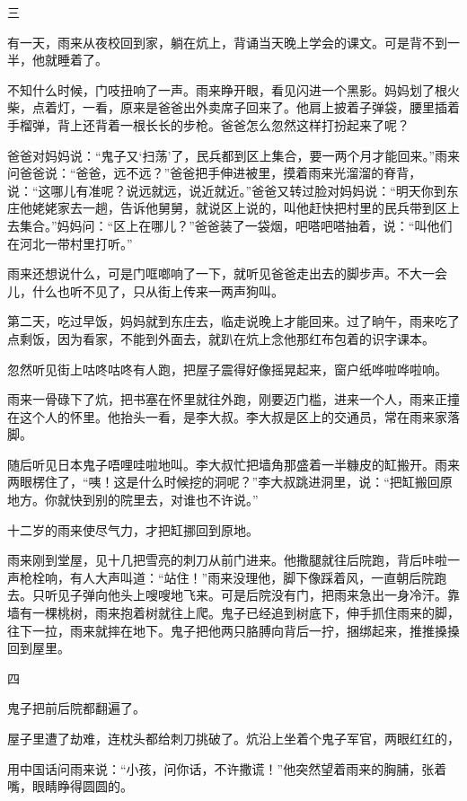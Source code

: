 \documentclass[12pt,UTF-8,openany]{ctexbook}
\begin{document}
\begin{Large}
    三
    
    有一天，雨来从夜校回到家，躺在炕上，背诵当天晚上学会的课文。可是背不到一半，他就睡着了。
    
    不知什么时候，门吱扭响了一声。雨来睁开眼，看见闪进一个黑影。妈妈划了根火柴，点着灯，一看，原来是爸爸出外卖席子回来了。他肩上披着子弹袋，腰里插着手榴弹，背上还背着一根长长的步枪。爸爸怎么忽然这样打扮起来了呢？
    
    爸爸对妈妈说：“鬼子又‘扫荡’了，民兵都到区上集合，要一两个月才能回来。”雨来问爸爸说：“爸爸，远不远？”爸爸把手伸进被里，摸着雨来光溜溜的脊背，说：“这哪儿有准呢？说远就远，说近就近。”爸爸又转过脸对妈妈说：“明天你到东庄他姥姥家去一趟，告诉他舅舅，就说区上说的，叫他赶快把村里的民兵带到区上去集合。”妈妈问：“区上在哪儿？”爸爸装了一袋烟，吧嗒吧嗒抽着，说：“叫他们在河北一带村里打听。”
    
    雨来还想说什么，可是门哐啷响了一下，就听见爸爸走出去的脚步声。不大一会儿，什么也听不见了，只从街上传来一两声狗叫。
    
    第二天，吃过早饭，妈妈就到东庄去，临走说晚上才能回来。过了晌午，雨来吃了点剩饭，因为看家，不能到外面去，就趴在炕上念他那红布包着的识字课本。
    
    忽然听见街上咕咚咕咚有人跑，把屋子震得好像摇晃起来，窗户纸哗啦哗啦响。
    
    雨来一骨碌下了炕，把书塞在怀里就往外跑，刚要迈门槛，进来一个人，雨来正撞在这个人的怀里。他抬头一看，是李大叔。李大叔是区上的交通员，常在雨来家落脚。
    
    随后听见日本鬼子唔哩哇啦地叫。李大叔忙把墙角那盛着一半糠皮的缸搬开。雨来两眼楞住了，“咦！这是什么时候挖的洞呢？”李大叔跳进洞里，说：“把缸搬回原地方。你就快到别的院里去，对谁也不许说。”
    
    十二岁的雨来使尽气力，才把缸挪回到原地。
    
    雨来刚到堂屋，见十几把雪亮的刺刀从前门进来。他撒腿就往后院跑，背后咔啦一声枪栓响，有人大声叫道：“站住！”雨来没理他，脚下像踩着风，一直朝后院跑去。只听见子弹向他头上嗖嗖地飞来。可是后院没有门，把雨来急出一身冷汗。靠墙有一棵桃树，雨来抱着树就往上爬。鬼子已经追到树底下，伸手抓住雨来的脚，往下一拉，雨来就摔在地下。鬼子把他两只胳膊向背后一拧，捆绑起来，推推搡搡回到屋里。
    
    四
    
    鬼子把前后院都翻遍了。
    
    屋子里遭了劫难，连枕头都给刺刀挑破了。炕沿上坐着个鬼子军官，两眼红红的，
    
    用中国话问雨来说：“小孩，问你话，不许撒谎！”他突然望着雨来的胸脯，张着嘴，眼睛睁得圆圆的。
    

\end{Large}
\end{document}
